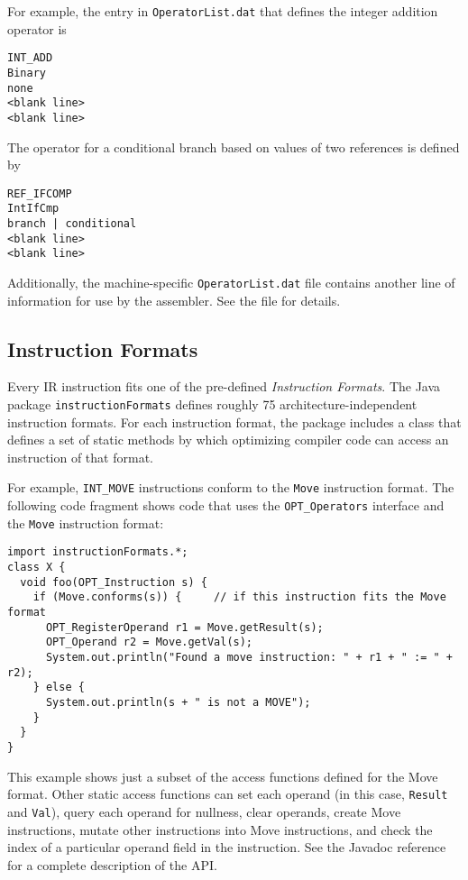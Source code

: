 For example, the entry in {\tt OperatorList.dat} that defines the integer
addition operator is
\begin{verbatim}
INT_ADD
Binary
none
<blank line>
<blank line>
\end{verbatim}

The operator for a conditional branch based on values of two references is
defined by
\begin{verbatim}
REF_IFCOMP
IntIfCmp
branch | conditional
<blank line>
<blank line>
\end{verbatim}

Additionally,  the machine-specific {\tt OperatorList.dat} file contains 
another line of information for use by the assembler.  See the file
for details. 

\subsection{Instruction Formats}\label{iformats}

Every IR instruction fits one of the pre-defined {\em Instruction Formats}.
The Java package {\tt instructionFormats} defines roughly 75 architecture-independent
instruction formats.  For each instruction format, the package includes a class
that defines a set of static methods by which optimizing compiler
code can access an instruction of that format.

For example, {\tt INT\_MOVE} instructions conform to the {\tt Move}
instruction format.  The following code fragment shows code that uses the
{\tt OPT\_Operators} interface and the {\tt Move} instruction format:
\begin{verbatim}
import instructionFormats.*;
class X {
  void foo(OPT_Instruction s) {
    if (Move.conforms(s)) {     // if this instruction fits the Move format
      OPT_RegisterOperand r1 = Move.getResult(s);
      OPT_Operand r2 = Move.getVal(s);
      System.out.println("Found a move instruction: " + r1 + " := " + r2);
    } else {
      System.out.println(s + " is not a MOVE");
    }
  }
}
\end{verbatim}

This example shows just a subset of the access functions defined for the
Move format.  Other static access functions can set each operand 
(in this case, {\tt Result} and {\tt Val}), query each operand for
nullness, clear operands, create Move instructions, mutate other
instructions into Move instructions, and check the index of a particular
operand field in the instruction.  See the Javadoc reference for a complete
description of the API.


